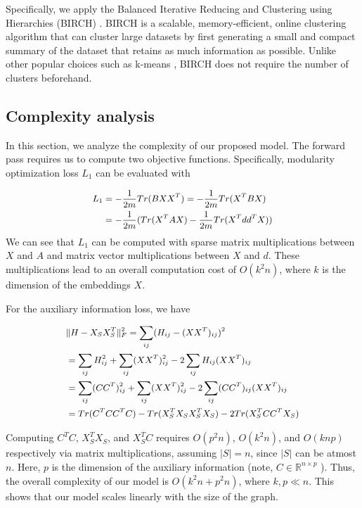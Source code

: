 Specifically, we apply the Balanced Iterative Reducing and Clustering using Hierarchies (BIRCH) \cite{zhang1996birch}. BIRCH is a scalable, memory-efficient, online clustering algorithm that can cluster large datasets by first generating a small and compact summary of the dataset that retains as much information as possible. Unlike other popular choices such as k-means \cite{hartigan1979algorithm}, BIRCH does not require the number of clusters beforehand. 






\subsection{Complexity analysis}
\label{subsec::complexity}
In this section, we analyze the complexity of our proposed model. The forward pass requires us to compute two objective functions. Specifically, modularity optimization loss $L_1$ can be evaluated with

\begin{equation}
\small
    \begin{aligned}
          L_1 &= -\frac{1}{2m} Tr(B XX^T) =-\frac{1}{2m} Tr(X^T B X)\\
          &=-\frac{1}{2m}( Tr(X^TAX) - \frac{1}{2m}Tr(X^Tdd^TX) )  
    \end{aligned}  
\end{equation}
We can see that $L_1$ can be computed with sparse matrix multiplications between $X$ and $A$ and matrix vector multiplications between $X$ and $d$. These multiplications lead to an overall computation cost of $O(k^2n)$, where $k$ is the dimension of the embeddings $X$. %

For the auxiliary information loss, we have

\begin{equation}
\small
    \begin{aligned}
        &\|H-X_SX_S^T\|_F^2=\sum_{ij}(H_{ij}-(XX^T)_{ij})^2\\
        &= \sum_{ij}H_{ij}^2+\sum_{ij}(XX^T)_{ij}^2
        - 2 \sum_{ij}H_{ij}(XX^T)_{ij}  \\
        &= \sum_{ij}(CC^T)_{ij}^2+\sum_{ij}(XX^T)_{ij}^2
        - 2 \sum_{ij}(CC^T)_{ij}(XX^T)_{ij}  \\
        &=Tr(C^TCC^TC)-Tr(X_S^TX_SX_S^TX_S)- 2 Tr(X_S^TCC^TX_S )\\
    \end{aligned}
\end{equation}


Computing $C^TC$, $X_S^TX_S$, and $X_S^TC$ requires $O(p^2n)$, $O(k^2n)$, and $O(knp)$ respectively via matrix multiplications, assuming $|S|=n$, since $|S|$ can be atmost $n$. Here, $p$ is the dimension of the auxiliary information (note, $C \in \mathbb{R}^{n \times p}$ ). Thus, the overall complexity of our model is $O(k^2n+p^2n)$, where $k,p \ll n$. This shows that our model scales linearly with the size of the graph. %









